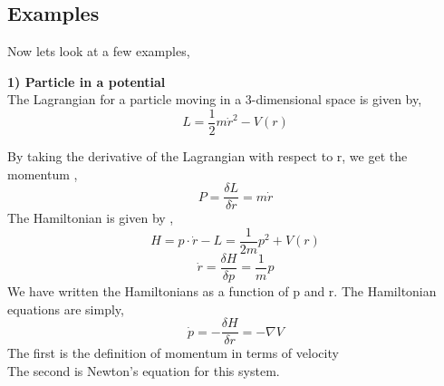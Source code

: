 	\subsection{Examples}
	Now lets look at a few examples, 
    \begin{tcolorbox}
    \textbf{1) Particle in a potential}
    \\
            The Lagrangian for a particle moving in a 3-dimensional space is given by, 
            \begin{equation}
            L = \frac{1}{2} m \dot{r}^{2} - V(r)
            \end{equation} 
            
            By taking the derivative of the Lagrangian with respect to r, we get the momentum ,
            \begin{equation}
                P = \frac{\delta L}{\delta \dot{r}} = m \dot{r} 
            \end{equation}
            The Hamiltonian is given by , 
            \begin{equation}
                H = p \cdot \dot{r} - L = \frac{1}{2m} p^{2} + V(r)
            \end{equation}
            \begin{equation}
                \dot{r} = \frac{\delta H}{\delta p} = \frac{1}{m}p
            \end{equation}
 We have written the Hamiltonians as a function of p and r. The Hamiltonian equations are simply, 
            \begin{equation}
           \dot{p} = - \frac{\delta H}{\delta r} = - \nabla V
            \end{equation}
        The first is the definition of momentum in terms of velocity \\
        The second is Newton's equation for this system.
    \end{tcolorbox}
